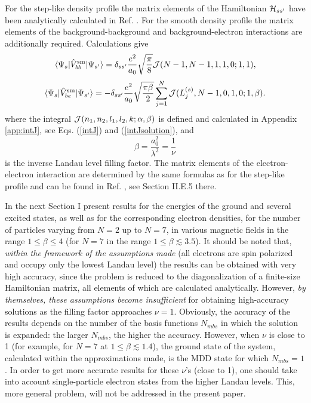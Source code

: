 \documentclass[aps,prb,10pt%
]{revtex4-2}
\def\be{\begin{equation}}
\def\ee{\end{equation}}
\begin{document}
For the step-like density profile the matrix elements of the Hamiltonian ${\cal H}_{ss'}$ have been analytically calculated in Ref. \cite{Mikhailov23a}. For the smooth density profile the matrix elements of the background-background and background-electron interactions are additionally required. Calculations give
\be 
\langle \Psi_s|\hat V_{bb}^{\rm sm}|\Psi_{s'}\rangle =\delta_{ss'}
\frac{e^2}{a_0} \sqrt{\frac\pi 8}{\cal J}(N-1,N-1,1,1,0;1,1),
\label{BB_smooth_matrixelements}
\ee
\be 
\langle \Psi_{s}| \hat V_{be}^{\rm sm}|\Psi_{s'}\rangle=
-\delta_{ss'} 
\frac{e^2}{a_0} \sqrt{\frac{\pi\beta} 2}
\sum_{j=1}^N {\cal J}(L_j^{(s)},N-1,0,1,0;1,\beta).
\label{BE_smooth_matrixelements}
\ee 
where the integral ${\cal J}(n_1,n_2,l_1,l_2,k;\alpha,\beta)$ is defined and calculated in Appendix \ref{app:intJ}, see Eqs. (\ref{intJ}) and (\ref{intJsolution}), and 
\be 
\beta=\frac{a_0^2}{\lambda^2}=\frac 1\nu
\ee 
is the inverse Landau level filling factor. The matrix elements of the electron-electron interaction are determined by the same formulas as for the step-like profile and can be found in Ref. \cite{Mikhailov23a}, see Section II.E.5 there.

In the next Section I present results for the energies of the ground and several excited states, as well as for the corresponding electron densities, for the number of particles varying from $N=2$ up to $N=7$, in various magnetic fields in the range $1\le \beta\le 4$ (for $N=7$ in the range $1\le \beta\lesssim 3.5$). It should be noted that, \textit{within the framework of the assumptions made} (all electrons are spin polarized and occupy only the lowest Landau level) the results can be obtained with very high accuracy, since the problem is reduced to the diagonalization of a finite-size Hamiltonian matrix, all elements of which are calculated analytically. However, \textit{by themselves, these assumptions become insufficient} for obtaining high-accuracy solutions as the filling factor approaches $\nu=1$. Obviously, the accuracy of the results depends on the number of the basis functions $N_{mbs}$ in which the solution is expanded: the larger $N_{mbs}$, the higher the accuracy. However, when $\nu$ is close to 1 (for example, for $N=7$ at $1\le \beta\lesssim 1.4$), the ground state of the system, calculated within the approximations made, is the MDD state for which $N_{mbs}=1$. In order to get more accurate results for these $\nu$'s (close to 1), one should take into account single-particle electron states from the higher Landau levels. This, more general problem, will not be addressed in the present  paper.
\end{document}
